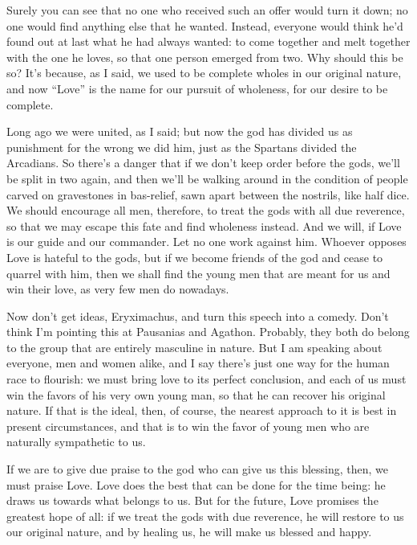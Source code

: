 Surely you can see that no one who received such an offer would turn it
down; no one would find anything else that he wanted. Instead, everyone
would think he’d found out at last what he had always wanted: to come
together and melt together with the one he loves, so that one person
emerged from two. Why should this be so? It’s because, as I said, we
used to be complete wholes in our original nature, and now “Love” is the
name  for our pursuit of wholeness, for our desire to be
complete.

Long ago we were united, as I said; but now the god has divided us as
punishment for the wrong we did him, just as the Spartans divided the
Arcadians. So there’s
a danger that if we don’t keep order before the gods, we’ll be split in
two again, and then we’ll be walking around in the condition of people
carved on gravestones in bas-relief, sawn apart between the nostrils,
like half dice. We should encourage all men, therefore, to treat 
the gods with all due reverence, so that we may escape this fate and
find wholeness instead. And we will, if Love is our guide and our
commander. Let no one work against him. Whoever opposes Love is hateful
to the gods, but if we become friends of the god and cease to quarrel
with him, then we shall find the young men that are meant for us and win
their love, as very few men do nowadays.

 Now don’t get ideas, Eryximachus, and turn this speech into a
comedy. Don’t think I’m pointing this at Pausanias and Agathon.
Probably, they both do belong to the group that are entirely masculine
in nature. But I am speaking about everyone, men and women alike, and I
say there’s just one way for the human race to flourish: we must bring
love to its perfect conclusion, and each of us must win the favors of
his very own young man, so that he can recover his original nature. If
that is the ideal, then, of course, the nearest approach to it is best
in present circumstances, and that is to win the favor of young men who
are naturally sympathetic to us.

 If we are to give due praise to the god who can give us this
blessing, then, we must praise Love. Love does the best that can be done
for the time being: he draws us towards what belongs to us. But for the
future, Love promises the greatest hope of all: if we treat the gods
with due reverence, he will restore to us our original nature, and by
healing us, he will make us blessed and happy.

